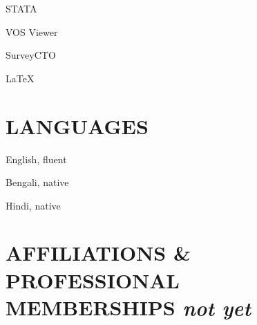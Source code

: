 \documentclass[final, 12pt]{article}
\begin{document}
STATA

VOS Viewer

SurveyCTO

\LaTeX


\section*{LANGUAGES}

English, fluent

Bengali, native

Hindi, native




\section*{AFFILIATIONS \& PROFESSIONAL MEMBERSHIPS \it not yet}






\end{document}
